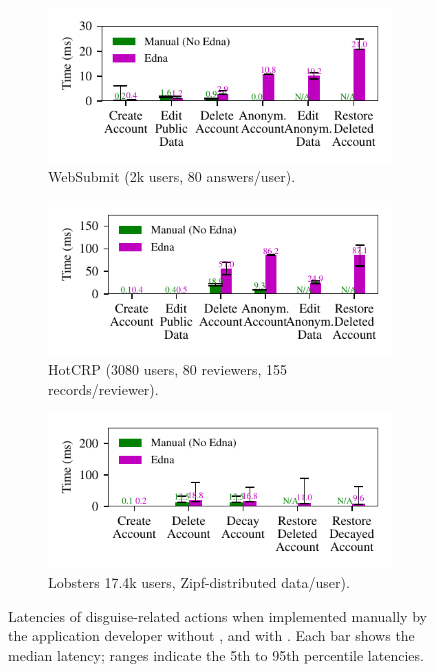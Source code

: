 \begin{figure}[t]
  \centering
  \begin{subfigure}[b]{\columnwidth}
    \includegraphics{figs/websubmit_op_stats}
    \caption{WebSubmit (2k users, 80 answers/user).}
    \label{f:ops-websubmit}
  \end{subfigure}
  \begin{subfigure}[b]{\columnwidth}
    \includegraphics{figs/hotcrp_op_stats}
    \caption{HotCRP (3080 users, 80 reviewers, 155 records/reviewer).}
    \label{f:ops-hotcrp}
  \end{subfigure}
  \begin{subfigure}[b]{\columnwidth}
    \includegraphics{figs/lobsters_op_stats}
    \caption{Lobsters 17.4k users, Zipf-distributed data/user).}
    \label{f:ops-lobsters}
  \end{subfigure}
  \caption{Latencies of disguise-related actions when implemented manually by the
  application developer without \sys, and with \sys.
  Each bar shows the median latency; ranges indicate the 5th to 95th
  percentile latencies.}
  \label{fig:client_opstats}
\end{figure}

